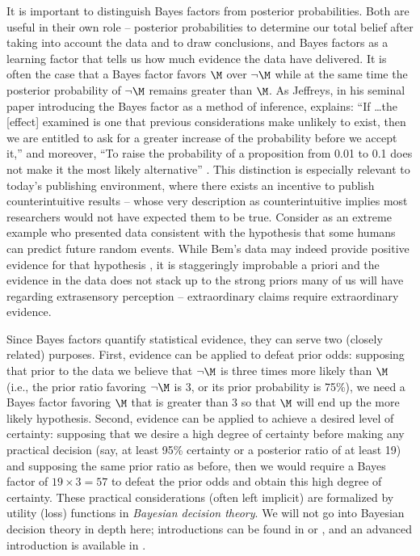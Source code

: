 It is important to distinguish Bayes factors from posterior probabilities. Both are useful in their own role -- posterior probabilities to determine our total belief after taking into account the data and to draw conclusions, and Bayes factors as a learning factor that tells us how much evidence the data have delivered. It is often the case that a Bayes factor favors $\M$ over $\neg\M$ while at the same time the posterior probability of $\neg\M$ remains greater than $\M$.  As Jeffreys, in his seminal paper introducing the Bayes factor as a method of inference, explains: ``If \dots  the [effect] examined is one that previous considerations make unlikely to exist, then we are entitled to ask for a greater increase of the probability before we accept it,'' and moreover, ``To raise the probability of a proposition from 0.01 to 0.1 does not make it the most likely alternative'' \cite[p.\ 221]{Jeffreys1935}. This distinction is especially relevant to today's publishing environment, where there exists an incentive to publish counterintuitive results -- whose very description as counterintuitive implies most researchers would not have expected them to be true. Consider as an extreme example  who presented data consistent with the hypothesis that some humans can predict future random events. While Bem's data may indeed provide positive evidence for that hypothesis \cite{RouderMorey2011}, it is staggeringly improbable a priori and the evidence in the data does not stack up to the strong priors many of us will have regarding extrasensory perception -- extraordinary claims require extraordinary evidence.

Since Bayes factors quantify statistical evidence, they can serve two (closely related) purposes. First, evidence can be applied to defeat prior odds: supposing that prior to the data we believe that $\neg\M$ is three times more likely than $\M$ (i.e., the prior ratio favoring $\neg\M$ is 3, or its prior probability is 75\%), we need a Bayes factor favoring $\M$ that is greater than 3 so that $\M$ will end up the more likely hypothesis. Second, evidence can be applied to achieve a desired level of certainty: supposing that we desire a high degree of certainty before making any practical decision 
(say, at least 95\% certainty or a posterior ratio of at least 19) and supposing the same prior ratio as before, then we would require a Bayes factor of $19 \times 3 = 57$ to defeat the prior odds and obtain this high degree of certainty. {These practical considerations (often left implicit) are formalized by utility (loss) functions in \textit{Bayesian decision theory}. We will not go into Bayesian decision theory in depth here; introductions can be found in  or , and an advanced introduction is available in .}

